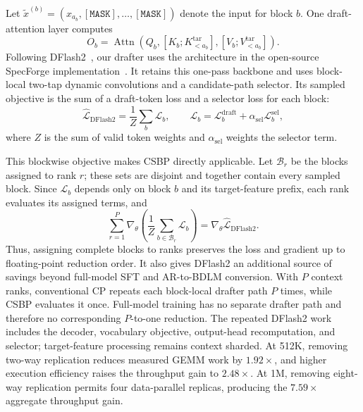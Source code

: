 Let
$\widetilde{x}^{(b)}=(x_{a_b},\mathtt{[MASK]},\ldots,\mathtt{[MASK]})$
denote the input for block $b$. One draft-attention layer computes
\begin{equation}
    O_b
    =
    \operatorname{Attn}\!\left(
      Q_b,
      [K_b;K_{<a_b}^{\mathrm{tar}}],
      [V_b;V_{<a_b}^{\mathrm{tar}}]
    \right).
    \label{eq:dflash2-block-attention}
\end{equation}
Following DFlash2~\citep{inco2026dflash2}, our drafter uses the architecture in
the open-source SpecForge implementation~\citep{specforge2025}. It retains this
one-pass backbone and uses block-local two-tap dynamic convolutions and a
candidate-path selector. Its sampled objective is the sum of a draft-token loss
and a selector loss for each block:
\begin{equation}
    \widehat{\mathcal{L}}_{\mathrm{DFlash2}}
    = \frac{1}{Z}\sum_b \mathcal{L}_b,
    \qquad
    \mathcal{L}_b
    = \mathcal{L}^{\mathrm{draft}}_b
      + \alpha_{\mathrm{sel}}\mathcal{L}^{\mathrm{sel}}_b,
    \label{eq:dflash2-training-objective}
\end{equation}
where $Z$ is the sum of valid token weights and $\alpha_{\mathrm{sel}}$ weights
the selector term.

This blockwise objective makes CSBP directly applicable. Let
$\mathcal B_r$ be the blocks assigned to rank $r$; these sets are disjoint and
together contain every sampled block. Since $\mathcal L_b$ depends only on block
$b$ and its target-feature prefix, each rank evaluates its assigned terms, and
\begin{equation}
    \sum_{r=1}^{P}
    \nabla_\theta\!\left(
      \frac{1}{Z}\sum_{b\in\mathcal B_r}\mathcal L_b
    \right)
    = \nabla_\theta\widehat{\mathcal L}_{\mathrm{DFlash2}}.
    \label{eq:dflash2-gradient-decomposition}
\end{equation}
Thus, assigning complete blocks to ranks preserves the loss and gradient up to
floating-point reduction order. It also gives DFlash2 an additional source of
savings beyond full-model SFT and AR-to-BDLM conversion. With $P$ context
ranks, conventional CP repeats each block-local drafter path $P$ times, while
CSBP evaluates it once. Full-model training has no separate drafter path and
therefore no corresponding $P$-to-one reduction. The repeated DFlash2 work
includes the decoder, vocabulary objective, output-head recomputation, and
selector; target-feature processing remains context sharded. At 512K, removing
two-way replication reduces measured GEMM work by $1.92\times$, and higher
execution efficiency raises the throughput gain to $2.48\times$. At 1M,
removing eight-way replication permits four data-parallel replicas, producing
the $7.59\times$ aggregate throughput gain.

